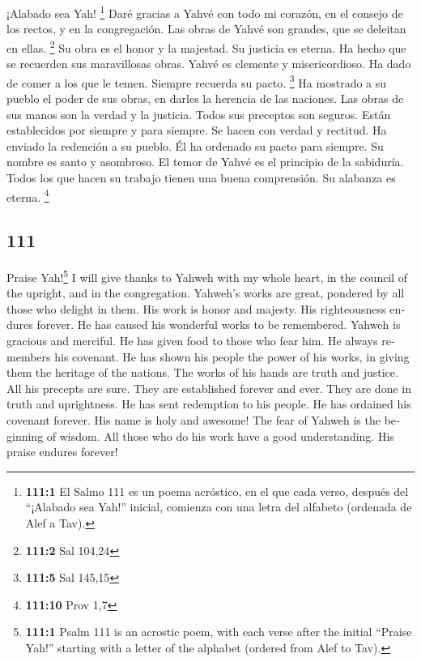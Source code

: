 \begin{paracol}{2}
 ¡Alabado sea Yah! \footnote{\textbf{111:1} El Salmo 111
  es un poema acróstico, en el que cada verso, después del ``¡Alabado
  sea Yah!'' inicial, comienza con una letra del alfabeto (ordenada de
  Alef a Tav).} Daré gracias a Yahvé con todo mi corazón, en el consejo
de los rectos, y en la congregación.  Las obras de Yahvé
son grandes, que se deleitan en ellas. \footnote{\textbf{111:2} Sal
  104,24}  Su obra es el honor y la majestad. Su justicia
es eterna.  Ha hecho que se recuerden sus maravillosas
obras. Yahvé es clemente y misericordioso.  Ha dado de
comer a los que le temen. Siempre recuerda su pacto. \footnote{\textbf{111:5}
  Sal 145,15}  Ha mostrado a su pueblo el poder de sus
obras, en darles la herencia de las naciones.  Las obras
de sus manos son la verdad y la justicia. Todos sus preceptos son
seguros.  Están establecidos por siempre y para siempre.
Se hacen con verdad y rectitud.  Ha enviado la redención a
su pueblo. Él ha ordenado su pacto para siempre. Su nombre es santo y
asombroso.  El temor de Yahvé es el principio de la
sabiduría. Todos los que hacen su trabajo tienen una buena comprensión.
Su alabanza es eterna. \footnote{\textbf{111:10} Prov 1,7}

\switchcolumn
\begin{otherlanguage}{english}

\hypertarget{section-221}{%
\section{111}\label{section-221}}

 Praise Yah!\footnote{\textbf{111:1} Psalm 111 is an
  acrostic poem, with each verse after the initial ``Praise Yah!''
  starting with a letter of the alphabet (ordered from Alef to Tav).} I
will give thanks to Yahweh with my whole heart, in the council of the
upright, and in the congregation.  Yahweh's works are
great, pondered by all those who delight in them.  His
work is honor and majesty. His righteousness endures forever.
 He has caused his wonderful works to be remembered.
Yahweh is gracious and merciful.  He has given food to
those who fear him. He always remembers his covenant.  He
has shown his people the power of his works, in giving them the heritage
of the nations.  The works of his hands are truth and
justice. All his precepts are sure.  They are established
forever and ever. They are done in truth and uprightness. 
He has sent redemption to his people. He has ordained his covenant
forever. His name is holy and awesome!  The fear of
Yahweh is the beginning of wisdom. All those who do his work have a good
understanding. His praise endures forever!


\end{otherlanguage}
\end{paracol}
